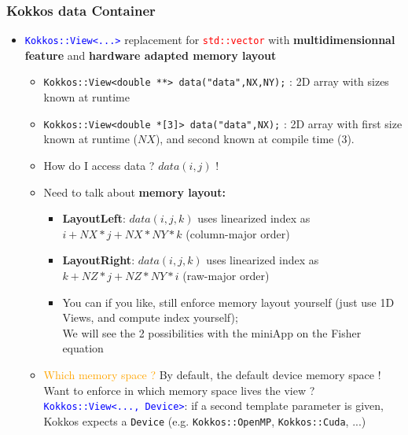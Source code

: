 \begin{frame}[fragile=singleslide]
  \frametitle{Kokkos data Container}

  \begin{itemize}
  \item \textcolor{blue}{\texttt{Kokkos::View<...>}} replacement for \textcolor{red}{\texttt{std::vector}} with \textbf{multidimensionnal feature} and \textbf{hardware adapted memory layout}\\
    \begin{itemize}
    \item \texttt{Kokkos::View<double **> data("data",NX,NY);} : 2D array with sizes known at runtime
    \item \texttt{Kokkos::View<double *[3]> data("data",NX);} : 2D array with first size known at runtime ($NX$), and second known at compile time (3).
    \item How do I access data ? $data(i,j)$ !
    \item Need to talk about \textbf{memory layout:}\\
      \begin{itemize}
      \item \textbf{LayoutLeft}: $data(i,j,k)$ uses linearized index as $i + NX*j + NX*NY * k$ (column-major order)
      \item \textbf{LayoutRight}: $data(i,j,k)$ uses linearized index as $k + NZ*j + NZ*NY * i$ (raw-major order)
      \item You can if you like, still enforce memory layout yourself (just use 1D Views, and compute index yourself);\\
        We will see the 2 possibilities with the miniApp on the Fisher equation
      \end{itemize}
    \item \textcolor{orange}{Which memory space ?} By default, the default device memory space !\\
      Want to enforce in which memory space lives the view ? 
      \textcolor{blue}{\texttt{Kokkos::View<..., Device>}}: if a second template parameter is given, Kokkos expects a \texttt{Device} (e.g. \texttt{Kokkos::OpenMP}, \texttt{Kokkos::Cuda}, ...)
    \end{itemize}
  \end{itemize}

\end{frame}

